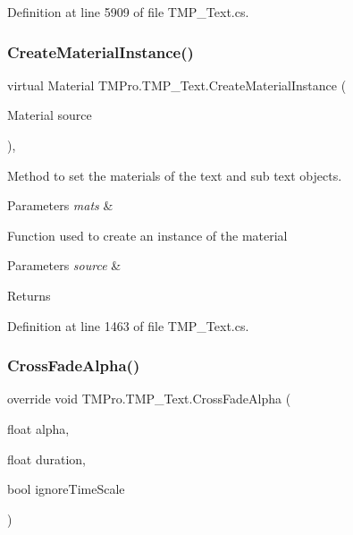 Definition at line 5909 of file T\+M\+P\+\_\+\+Text.\+cs.

\mbox{\label{class_t_m_pro_1_1_t_m_p___text_a427ecf798a6c03dd9f3230b3ceaf1f61}} 
\subsubsection{\texorpdfstring{CreateMaterialInstance()}{CreateMaterialInstance()}}
{\footnotesize\ttfamily virtual Material T\+M\+Pro.\+T\+M\+P\+\_\+\+Text.\+Create\+Material\+Instance (\begin{DoxyParamCaption}\item[{Material}]{source }\end{DoxyParamCaption})\hspace{0.3cm}{\ttfamily [protected]}, {\ttfamily [virtual]}}



Method to set the materials of the text and sub text objects. 


\begin{DoxyParams}{Parameters}
{\em mats} & \\
\hline
\end{DoxyParams}


Function used to create an instance of the material 


\begin{DoxyParams}{Parameters}
{\em source} & \\
\hline
\end{DoxyParams}
\begin{DoxyReturn}{Returns}

\end{DoxyReturn}


Definition at line 1463 of file T\+M\+P\+\_\+\+Text.\+cs.

\mbox{\label{class_t_m_pro_1_1_t_m_p___text_a543340c801ac45054c80221f3c5cecba}} 
\subsubsection{\texorpdfstring{CrossFadeAlpha()}{CrossFadeAlpha()}}
{\footnotesize\ttfamily override void T\+M\+Pro.\+T\+M\+P\+\_\+\+Text.\+Cross\+Fade\+Alpha (\begin{DoxyParamCaption}\item[{float}]{alpha,  }\item[{float}]{duration,  }\item[{bool}]{ignore\+Time\+Scale }\end{DoxyParamCaption})}



